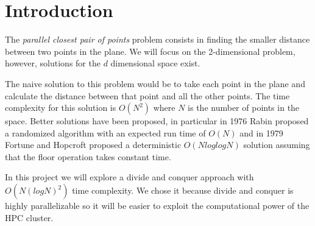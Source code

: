 \section{Introduction}
\label{sec:introduction}

The \textit{parallel closest pair of points} problem consists
in finding the smaller distance between two points in the plane.
We will focus on the 2-dimensional problem, however, solutions for
the $d$ dimensional space exist.

The naive solution to this problem would be to take each point
in the plane and calculate the distance between that point and all
the other points. The time complexity for this solution is $O(N^2)$
where $N$ is the number of points in the space.
Better solutions have been proposed, in particular in 1976
Rabin proposed a randomized algorithm with an expected run time
of $O(N)$ and in 1979 Fortune and Hopcroft proposed a
deterministic $O(N log log N)$ solution \cite{Fortune_Hopcroft}
assuming that the floor operation takes constant time.

In this project we will explore a divide and conquer approach
with $O(N(logN)^2)$ time complexity. We chose it because
divide and conquer is highly parallelizable so it will be easier
to exploit the computational power of the HPC cluster.
